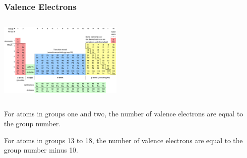 \documentclass{beamer}
\begin{document}
\begin{frame}


    \frametitle{Valence Electrons}
    \begin{columns}
        
        \begin{column}{0.5\textwidth}
            \includegraphics[width=6cm]{../../../../public/images/pTable.png}
            
        \end{column}
        \begin{column}{0.5\textwidth}

            
        \end{column}
    \end{columns}

    \vspace{1cm}

    \onslide For atoms in groups 
    \pause \alert{one} 
    \onslide and 
    \pause \alert{two},
    \onslide  the number of 
    \pause \alert{valence} electrons 
    \onslide are equal to the group number.
    
    \vspace{1cm}
    

    \onslide For atoms in groups 
    \pause \alert{13} 
    \onslide to 
    \pause \alert{18},
    \onslide the number of 
    \pause \alert{valence} electrons 
    \onslide are equal to the group number minus 10.
\end{frame}
\end{document}
